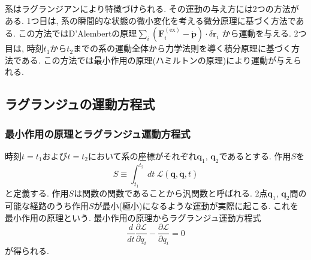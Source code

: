系はラグランジアンにより特徴づけられる.
その運動の与え方には2つの方法がある.
1つ目は, 系の瞬間的な状態の微小変化を考える微分原理に基づく方法である.
この方法ではD'Alembertの原理$\sum_{i} (\bm{F}_{i}^{\mathrm{(ex)}} - \dot{\bm{p}}) \cdot \delta \bm{r}_{i}$
から運動を与える.
2つ目は, 時刻$t_{1}$から$t_{2}$までの系の運動全体から力学法則を導く積分原理に基づく方法である.
この方法では最小作用の原理(ハミルトンの原理)により運動が与えられる.

\subsection{ラグランジュの運動方程式}
\subsubsection{最小作用の原理とラグランジュ運動方程式}
時刻$t = t_{1}$および$t = t_{2}$において系の座標がそれぞれ$\bm{q}_{1}$, $\bm{q}_{2}$であるとする.
作用$S$を
\begin{equation}
 S \equiv \int_{t_{1}}^{t_{2}}~dt~\mathcal{L}(\bm{q}, \dot{\bm{q}}, t)
\end{equation}
と定義する.
作用$S$は関数の関数であることから汎関数と呼ばれる.
2点$\bm{q}_{1}$, $\bm{q}_{2}$間の可能な経路のうち作用$S$が最小(極小)になるような運動が実際に起こる.
これを最小作用の原理という. 
最小作用の原理からラグランジュ運動方程式
\begin{equation}
 \frac{d}{d t}
 \frac{\partial \mathcal{L}}{\partial \dot{q}_{i}}
-\frac{\partial \mathcal{L}}{\partial q_{i}}
= 0
\end{equation}
が得られる.

